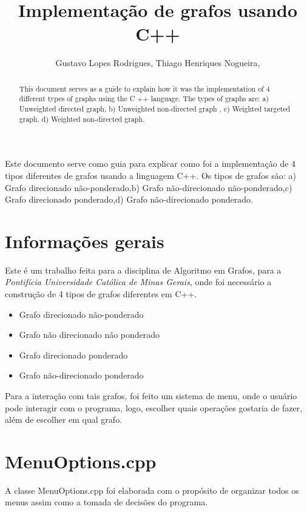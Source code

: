 \documentclass[12pt]{article}
\title{Implementação de grafos usando C++}
\author{Gustavo Lopes Rodrigues\inst{1}, Thiago Henriques Nogueira\inst{2},}
\begin{document}
 

\maketitle

\begin{abstract} 
  This document serves as a guide to explain how it
  was the implementation
  of 4 different types of graphs using the C ++ language. The types of
  graphs are: a) Unweighted directed graph, b) Unweighted non-directed graph
  , c) Weighted targeted graph, d) Weighted non-directed graph.
\end{abstract}

\begin{resumo} 
  Este documento serve como guia para explicar como foi a implementação
  de 4 tipos diferentes de grafos usando a linguagem C++. Os tipos de 
  grafos são: a) Grafo direcionado não-ponderado,b) Grafo não-direcionado 
  não-ponderado,c) Grafo direcionado ponderado,d) Grafo não-direcionado 
  ponderado.
\end{resumo}


\section{Informações gerais}

  Este é um trabalho feita para a disciplina de Algoritmo em Grafos, para a \emph{Pontifícia Universidade Católica de Minas Gerais},
  onde foi necessário a construção de 4 tipos de grafos diferentes em C++.

  \begin{itemize}
    \item Grafo direcionado não-ponderado
    \item Grafo não direcionado não ponderado 
    \item Grafo direcionado ponderado
    \item Grafo não-direcionado ponderado
  \end{itemize}

  Para a interação com tais grafos, foi feito um sistema de menu, onde o usuário pode interagir com o programa,
  logo, escolher quais operações gostaria de fazer, além de escolher em qual grafo.

  \section{MenuOptions.cpp}

  A classe MenuOptions.cpp foi elaborada com o propósito de organizar todos os menus assim como a tomada de decisões do programa.
\end{document}
